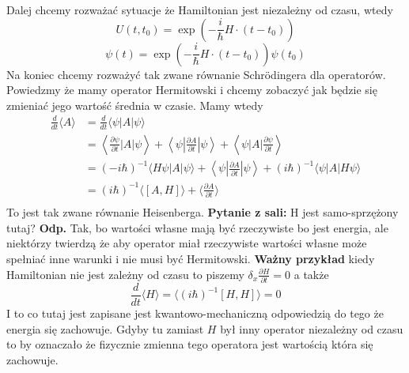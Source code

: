 Dalej chcemy rozważać sytuacje że Hamiltonian jest niezależny od czasu, wtedy $$  U\left(t, t_{0}\right)=\exp \left(-\frac{i}{\hbar} H \cdot(t-t_{0})\right)  $$
$$  \psi(t)=\exp \left(-\frac{i}{\hbar} H \cdot(t-t_{0})\right) \psi(t_0)  $$
Na koniec chcemy rozważyć tak zwane równanie Schrödingera dla operatorów. Powiedzmy że mamy operator Hermitowski i chcemy zobaczyć jak będzie się zmieniać jego wartość średnia w czasie. Mamy wtedy 
\begin{equation*}
	\begin{split}
		\frac{d}{dt} \langle A \rangle &= \frac{d}{d t}\langle\psi| A|\psi\rangle \\
		&= \left\langle\frac{\partial \psi}{\partial t}\left|  A\right| \psi\right\rangle+\left\langle\psi| \frac{\partial A}{\partial t}| \psi\right\rangle+\left\langle\psi\left| A\right|\frac{\partial \psi}{\partial t}\right\rangle \\
		&= (-i \hbar)^{-1} \langle H\psi| A|\psi\rangle + \left\langle\psi| \frac{\partial A}{\partial t}| \psi\right\rangle + (i \hbar)^{-1} \langle \psi| A|H\psi\rangle \\
		&= (i\hbar)^{-1} \langle [A, H] \rangle + \langle \frac{\partial A}{\partial t} \rangle \\
	\end{split}
\end{equation*}
To jest tak zwane równanie Heisenberga. \textbf{Pytanie z sali:} H jest samo-sprzężony tutaj? \textbf{Odp.} Tak, bo wartości własne mają być rzeczywiste bo jest energia, ale niektórzy twierdzą że aby operator miał rzeczywiste wartości własne może spełniać inne warunki i nie musi być Hermitowski.
\textbf{Ważny przykład} kiedy Hamiltonian nie jest zależny od czasu to piszemy $\delta_x \frac{\partial H}{\partial t} = 0$ a także $$ \frac{d}{dt} \langle H \rangle =\langle (i \hbar)^{-1} [H, H] \rangle = 0$$
I to co tutaj jest zapisane jest kwantowo-mechaniczną odpowiedzią do tego że energia się zachowuje. Gdyby tu zamiast $H$ był inny operator niezależny od czasu to by oznaczało że fizycznie zmienna tego operatora jest wartością która się zachowuje.
